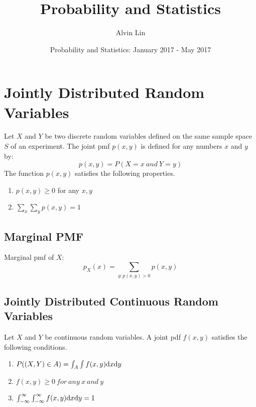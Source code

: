 \documentclass{math}
\title{Probability and Statistics}
\author{Alvin Lin}
\date{Probability and Statistics: January 2017 - May 2017}
\begin{document}
\maketitle

\section*{Jointly Distributed Random Variables}
Let \( X \) and \( Y \) be two discrete random variables defined on the same
sample space \( S \) of an experiment. The joint pmf \( p(x,y) \) is defined
for any numbers \( x \) and \( y \) by:
\[ p(x,y) = P(X=x\ and\ Y=y) \]
The function \( p(x,y) \) satisfies the following properties.
\begin{enumerate}
  \item \( p(x,y) \geq 0 \) for any \( x,y \) \\
  \item \( \sum_{x}\sum_{y}p(x,y) = 1 \) \\
\end{enumerate}

\subsection*{Marginal PMF}
Marginal pmf of \( X \):
\[ p_{X}(x) = \sum_{y:p(x,y)>0}p(x,y) \]

\subsection*{Jointly Distributed Continuous Random Variables}
Let \( X \) and \( Y \) be continuous random variables. A joint pdf \( f(x,y) \)
satisfies the following conditions.
\begin{enumerate}
  \item \( P((X,Y)\in A) = \int_{A}\int f(x,y)\mathrm{d}{x}\mathrm{d}{y} \)
  \item \( f(x,y)\geq 0\ for\ any\ x\ and\ y \) \\
  \item \( \int_{-\infty}^{\infty}\int_{-\infty}^{\infty}
    f(x,y)\mathrm{d}{x}\mathrm{d}{y} = 1 \)
\end{enumerate}
\end{document}
